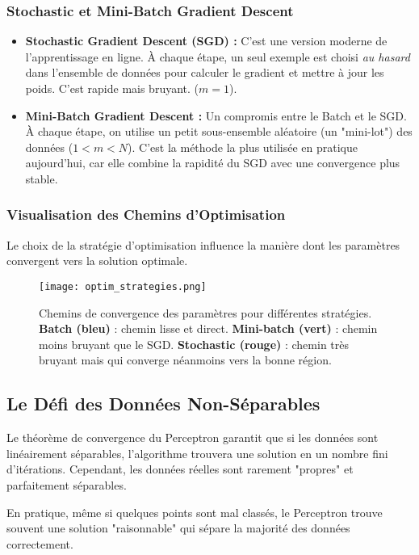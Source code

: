\documentclass[12pt]{article}
\begin{document}
\subsubsection{Stochastic et Mini-Batch Gradient Descent}
\begin{itemize}
    \item \textbf{Stochastic Gradient Descent (SGD) :} C'est une version moderne de l'apprentissage en ligne. À chaque étape, un seul exemple est choisi \textit{au hasard} dans l'ensemble de données pour calculer le gradient et mettre à jour les poids. C'est rapide mais bruyant. ($m=1$).
    \item \textbf{Mini-Batch Gradient Descent :} Un compromis entre le Batch et le SGD. À chaque étape, on utilise un petit sous-ensemble aléatoire (un "mini-lot") des données ($1 < m < N$). C'est la méthode la plus utilisée en pratique aujourd'hui, car elle combine la rapidité du SGD avec une convergence plus stable.
\end{itemize}

\subsubsection{Visualisation des Chemins d'Optimisation}
Le choix de la stratégie d'optimisation influence la manière dont les paramètres convergent vers la solution optimale.

\begin{figure}[h!]
    \centering
    \texttt{[image: optim\_strategies.png]}
    \caption{Chemins de convergence des paramètres pour différentes stratégies. \textbf{Batch (bleu)} : chemin lisse et direct. \textbf{Mini-batch (vert)} : chemin moins bruyant que le SGD. \textbf{Stochastic (rouge)} : chemin très bruyant mais qui converge néanmoins vers la bonne région.}
    \label{fig:optim}
\end{figure}

\subsection{Le Défi des Données Non-Séparables}
Le théorème de convergence du Perceptron garantit que si les données sont linéairement séparables, l'algorithme trouvera une solution en un nombre fini d'itérations. Cependant, les données réelles sont rarement "propres" et parfaitement séparables.

En pratique, même si quelques points sont mal classés, le Perceptron trouve souvent une solution "raisonnable" qui sépare la majorité des données correctement.
\end{document}
